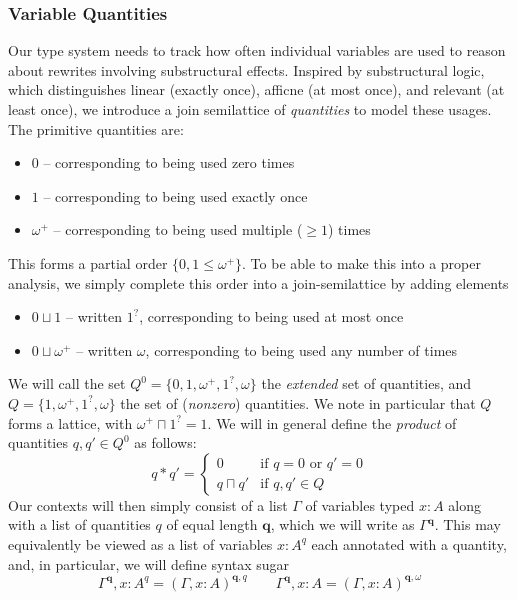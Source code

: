 \documentclass[acmsmall,screen,review]{acmart}
\newcommand{\mb}[1]{\ensuremath{\mathbf{#1}}}
\newcommand{\zeroq}{0}
\newcommand{\oneq}{1}
\newcommand{\delq}{1^?}
\newcommand{\cpyq}{\omega^+}
\newcommand{\topq}{\omega}
\begin{document}
\subsubsection{Variable Quantities}
Our type system needs to track how often individual variables are used  to reason about rewrites
involving substructural effects. Inspired by substructural logic, which distinguishes linear
(exactly once), afficne (at most once), and relevant (at least once), we introduce a join
semilattice of \emph{quantities} to model these usages. The primitive quantities are:
\begin{itemize}
  \item $\zeroq$ -- corresponding to being used zero times
  \item $\oneq$ -- corresponding to being used exactly once
  \item $\cpyq$ -- corresponding to being used multiple ($\geq 1$) times
\end{itemize}
This forms a partial order $\{\zeroq, \oneq \leq \cpyq\}$. To be able to make this into a proper
analysis, we simply complete this order into a join-semilattice by adding elements
\begin{itemize}
  \item $\zeroq \sqcup \oneq$ -- written $\delq$, corresponding to being used at most once
  \item $\zeroq \sqcup \cpyq$ -- written $\topq$, corresponding to being used any number of times
\end{itemize}
We will call the set $Q^0 = \{\zeroq, \oneq, \cpyq, \delq, \topq\}$ the \emph{extended} set of
quantities, and $Q = \{\oneq, \cpyq, \delq, \topq\}$ the set of (\emph{nonzero}) quantities. We note
in particular that $Q$ forms a lattice, with $\cpyq \sqcap \delq = 1$. We will in general define the
\emph{product} of quantities $q, q' \in Q^0$ as follows:
\begin{equation}
  q * q' = \begin{cases}
    0 & \text{if } q = 0 \text{ or } q' = 0 \\
    q \sqcap q' & \text{if } q, q' \in Q
  \end{cases}
\end{equation}
Our contexts will then simply
consist of a list $\Gamma$ of variables typed $x : A$ along with a list of quantities $q$ of equal
length $\mb{q}$, which we will write as $\Gamma^{\mb{q}}$. This may equivalently be viewed as a list
of variables $x : A^q$ each annotated with a quantity, and, in particular, we will define syntax
sugar
\begin{equation}
  \Gamma^{\mb{q}}, x : A^q = (\Gamma, x : A)^{\mb{q}, q} \qquad
  \Gamma^{\mb{q}}, x : A =  (\Gamma, x : A)^{\mb{q}, \topq}
\end{equation}
\end{document}
